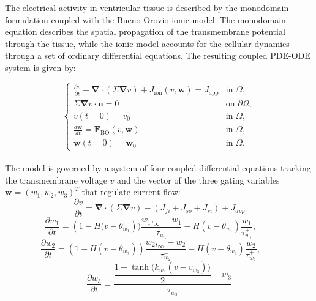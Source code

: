 \documentclass{Configuration_Files/PoliMi3i_thesis}
\begin{document}
The electrical activity in ventricular tissue is described by the monodomain formulation coupled with the Bueno-Orovio ionic model. The monodomain equation describes the spatial propagation of the transmembrane potential through the tissue, while the ionic model accounts for the cellular dynamics through a set of ordinary differential equations. The resulting coupled PDE-ODE system is given by:

\begin{equation}
\left\{
\begin{array}{ll}
\displaystyle
\frac{\partial v}{\partial t}
-\boldsymbol{\nabla}\cdot(\Sigma\boldsymbol{\nabla} v)
+J_{\mathrm{ion}}(v,\mathbf{w})
=J_{\mathrm{app}}
& \text{in }\Omega, \\
\Sigma\boldsymbol{\nabla} v\cdot\mathbf{n} = 0
& \text{on }\partial\Omega, \\
v(t=0)=v_0
& \text{in }\Omega, \\
\displaystyle
\frac{d\mathbf{w}}{dt}=\mathbf{F}_{\mathrm{BO}}(v,\mathbf{w})
& \text{in }\Omega, \\
\mathbf{w}(t=0)=\mathbf{w}_0
& \text{in }\Omega.
\end{array}
\right.
\end{equation}
\\
The model is governed by a system of four coupled differential equations tracking the transmembrane voltage $v$ and the vector of the three gating variables $\mathbf{w}=(w_1, w_2, w_3)^T$ that regulate current flow:\\


\begin{equation}
    \frac{\partial v}{\partial t} = \boldsymbol{\nabla} \cdot \left( \Sigma\boldsymbol{\nabla} v \right) - \left( J_{fi} + J_{so} + J_{si} \right) + J_{app}
    \label{eq:placeholder_label}
\end{equation}
\begin{equation}
    \label{eq:placeholder_label}
    \frac{\partial w_1}{\partial t} = \left(1 - H(v - \theta_{w_1}\right))\frac{w_1,_\infty - w_1}{\tau_{w_1}^-} - H(v - \theta_{w_1})\frac{w_1}{\tau_{w_1}^+}, \qquad
\end{equation}
\begin{equation}
    \frac{\partial w_2}{\partial t} = \left(1 - H(v - \theta_{w_2})\right)\frac{w_2,_\infty - w_2}{\tau_{w_2}^-} - H(v - \theta_{w_2})\frac{w_2}{\tau_{w_2}^+}, \qquad
\end{equation}
\begin{equation}
    \frac{\partial w_3}{\partial t} = \frac{\dfrac{1 + \tanh\!\big(k_{w_3} (v - v_{w_3})\big)}{2} - w_3}{\tau_{w_3}}
\end{equation}
\newline
\end{document}

